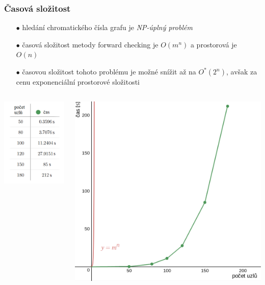 \documentclass[10pt,xcolor=pdflatex]{beamer}
\begin{document}
\begin{frame}\frametitle{Časová složitost}
	\begin{itemize}
	\item[$\bullet$] hledání chromatického čísla grafu je \emph{NP-úplný problém}
    \item[$\bullet$] časová složitost metody forward checking je \emph{$O(m^n)$} a prostorová je \emph{$O(n)$}
    \item[$\bullet$] časovou složitost tohoto problému je možné snížit až na \emph{$O^{*}(2^n)$}, avšak za cenu exponenciální prostorové složitosti
    \end{itemize}
    \begin{columns}
    \begin{column}{0.5\textwidth}
    \includegraphics[scale=0.4]{img/complex1.png}
    \end{column}
    \begin{column}{0.5\textwidth}
    \includegraphics[scale=0.19]{img/complex2.png}
    \end{column}
    \end{columns}
\end{frame}
\end{document}
